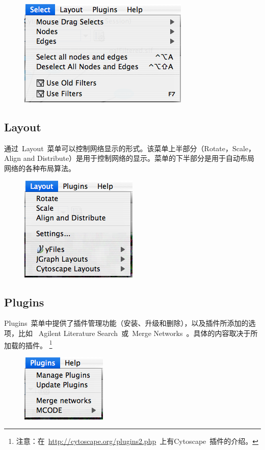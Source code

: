 	\begin{figure}[!h]
	\centerline{\includegraphics[scale=0.6]{images/menu_select_26.png}}
	\end{figure}

	\subsection{Layout}
	通过~Layout~菜单可以控制网络显示的形式。该菜单上半部分（Rotate，Scale，Align and
	 Distribute）是用于控制网络的显示。菜单的下半部分是用于自动布局网络的各种布局算法。

	\begin{figure}[!h]
	\centerline{\includegraphics[scale=0.6]{images/menu_layout_25.png}}
	\end{figure}
	
		
	
	\subsection{Plugins}
	Plugins~菜单中提供了插件管理功能（安装、升级和删除），以及插件所添加的选项，比如
	~Agilent Literature Search~或~Merge Networks~。具体的内容取决于所加载的插件。
	\footnote{注意：在~\href{http://cytoscape.org/plugins2.php}
	{http://cytoscape.org/plugins2.php}~上有Cytoscape~插件的介绍。}
	
	\begin{figure}[!h]
	\centerline{\includegraphics[scale=0.6]{images/menu_plugins_25.png}}
	\end{figure}
	
